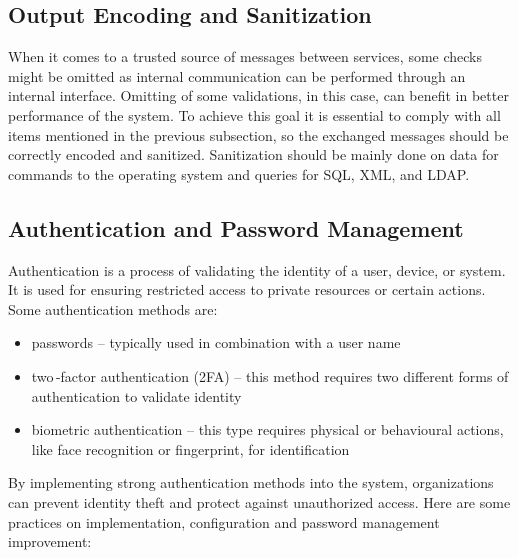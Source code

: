   \subsection*{Output Encoding and Sanitization}
    When it comes to a trusted source of messages between services, some checks might be omitted as internal
    communication can be performed through an internal interface. Omitting of some validations, in this case,
    can benefit in better performance of the system. To achieve this goal it is essential to comply with
    all items mentioned in the previous subsection, so the exchanged messages should be correctly encoded
    and sanitized. Sanitization should be mainly done on data for commands to the operating system and queries
    for SQL, XML, and LDAP.

  \subsection*{Authentication and Password Management}
    Authentication is a process of validating the identity of a user, device, or system. It is used for
    ensuring restricted access to private resources or certain actions. Some authentication methods
    are:
    \begin{itemize}
      \item passwords -- typically used in combination with a user name
      \item two\,-factor authentication (2FA) -- this method requires two different forms of authentication
            to validate identity
      \item biometric authentication -- this type requires physical or behavioural actions, like
            face recognition or fingerprint, for identification
    \end{itemize}
    By implementing strong authentication methods into the system, organizations can prevent identity theft
    and protect against unauthorized access. Here are some practices on implementation, configuration
    and password management improvement:

